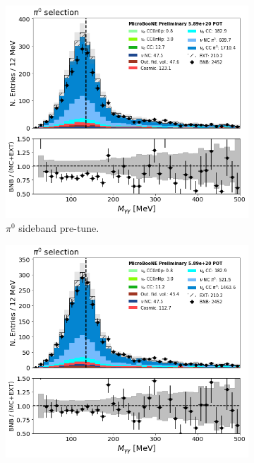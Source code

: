 \begin{figure}[H] 
\begin{center}
    \begin{subfigure}[b]{0.45\textwidth}
    \centering
    \includegraphics[width=1.00\textwidth]{pi0/pi0tune/mass_noscaling.png}
    \caption{\label{fig:pi0tune00} $\pi^0$ sideband pre-tune.}
    \end{subfigure}
    \begin{subfigure}[b]{0.45\textwidth}
    \centering
    \includegraphics[width=1.00\textwidth]{pi0/pi0tune/mass_energycaling.png}

\end{subfigure}
\end{center}
\end{figure}
